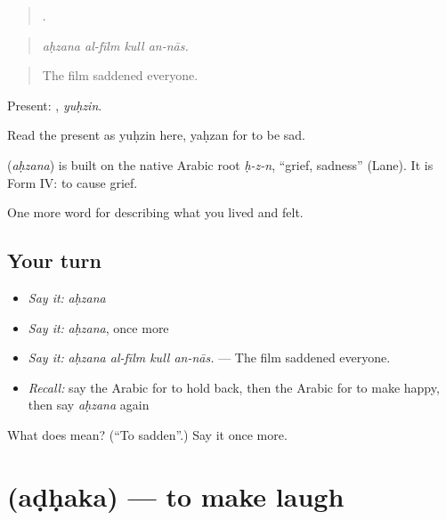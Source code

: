 \begin{quote}
   .
\end{quote}

\begin{quote}
\emph{aḥzana al-fīlm kull an-nās.}
\end{quote}

\begin{quote}
The film saddened everyone.
\end{quote}

Present: , \emph{yuḥzin}.

Read the present  as yuḥzin here, yaḥzan for to be sad.

\begin{cousinweb}
\textbf{} (\emph{aḥzana}) is built on the native Arabic root \emph{ḥ-z-n}, \textquotedblleft{}grief, sadness\textquotedblright{} (Lane). It is Form IV: to cause grief.
\end{cousinweb}

\begin{grammarlens}[title={What you've built}]
One more word for describing what you lived and felt.
\end{grammarlens}

\subsection*{Your turn}
\begin{itemize}
\raggedright
  \item \emph{Say it:} \emph{aḥzana}
  \item \emph{Say it:} \emph{aḥzana}, once more
  \item \emph{Say it:} \emph{aḥzana al-fīlm kull an-nās.} — The film saddened everyone.
  \item \emph{Recall:} say the Arabic for to hold back, then the Arabic for to make happy, then say \emph{aḥzana} again
\end{itemize}

\begin{tcolorbox}[breakable,colback=teal!4,colframe=teal!35!black,title={Before you move on}]
What does  mean? (\textquotedblleft{}To sadden\textquotedblright{}.) Say it once more.
\end{tcolorbox}
\section[\texorpdfstring{\ar{أضحك} (aḍḥaka)}{أضحك (aḍḥaka)}]{ (aḍḥaka) — to make laugh}

